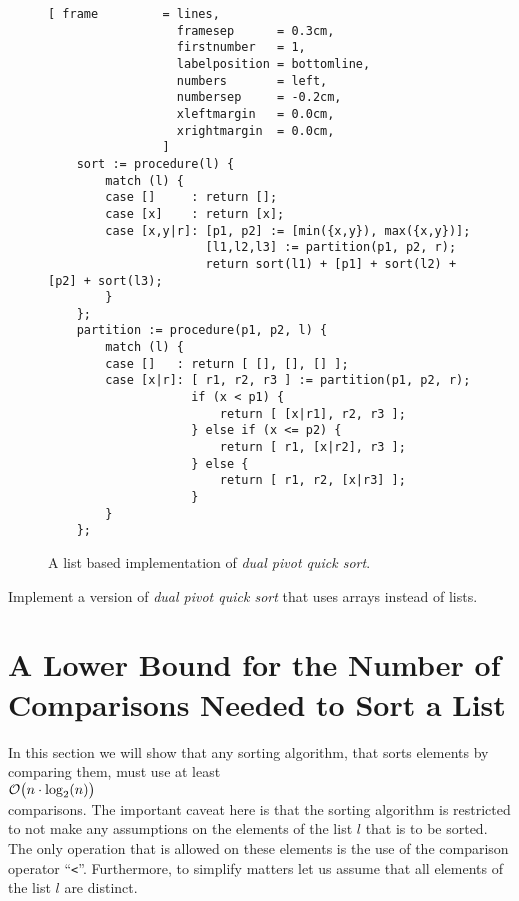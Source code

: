 \begin{figure}[!ht]
\centering
\begin{Verbatim}[ frame         = lines, 
                  framesep      = 0.3cm, 
                  firstnumber   = 1,
                  labelposition = bottomline,
                  numbers       = left,
                  numbersep     = -0.2cm,
                  xleftmargin   = 0.0cm,
                  xrightmargin  = 0.0cm,
                ]
    sort := procedure(l) {
        match (l) {
        case []     : return [];
        case [x]    : return [x];
        case [x,y|r]: [p1, p2] := [min({x,y}), max({x,y})];
                      [l1,l2,l3] := partition(p1, p2, r);
                      return sort(l1) + [p1] + sort(l2) + [p2] + sort(l3);
        }
    };
    partition := procedure(p1, p2, l) {
        match (l) {
        case []   : return [ [], [], [] ];
        case [x|r]: [ r1, r2, r3 ] := partition(p1, p2, r);
                    if (x < p1) {
                        return [ [x|r1], r2, r3 ];
                    } else if (x <= p2) {
                        return [ r1, [x|r2], r3 ];
                    } else {
                        return [ r1, r2, [x|r3] ];
                    }
        }
    };
\end{Verbatim}
\vspace*{-0.3cm}
\caption{A list based implementation of \emph{dual pivot quick sort}.}
\label{fig:dual-pivot-quick-sort.stlx}
\end{figure}

\exercise
Implement a version of \emph{dual pivot quick sort} that uses arrays instead of lists.


\section[A Lower Bound]{A Lower Bound for the Number of Comparisons Needed to Sort a List}
In this section we will show that any sorting algorithm, that sorts elements by comparing them, must
use at least 
\\[0.2cm]
\hspace*{1.3cm}
 $\mathcal{O}\bigl(n \cdot \log_2(n)\bigr)$ 
\\[0.2cm]
comparisons.  The important caveat here is that the sorting algorithm is restricted to not make any assumptions
on the elements of the list $l$ that is to be sorted.  The only operation that is allowed on these
elements is the use of the comparison operator ``\texttt{<}''.  Furthermore, to simplify matters let
us assume that all elements of the list $l$ are distinct.

